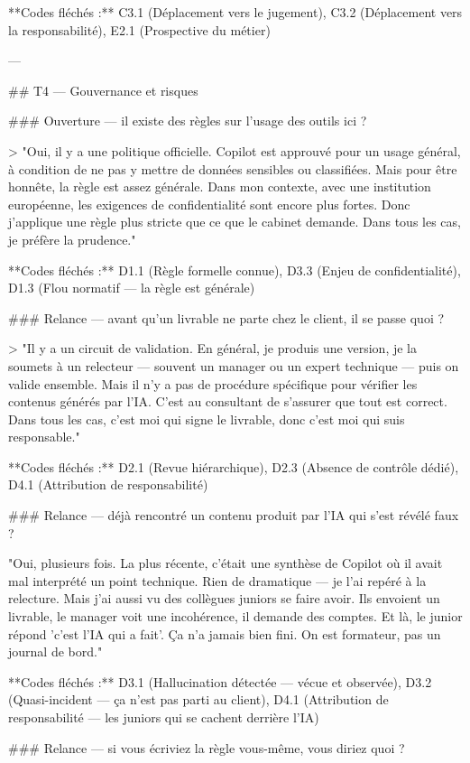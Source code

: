 **Codes fléchés :** C3.1 (Déplacement vers le jugement), C3.2 (Déplacement vers la responsabilité), E2.1 (Prospective du métier)

---

## T4 — Gouvernance et risques

### Ouverture — il existe des règles sur l'usage des outils ici ?

> "Oui, il y a une politique officielle. Copilot est approuvé pour un usage général, à condition de ne pas y mettre de données sensibles ou classifiées. Mais pour être honnête, la règle est assez générale. Dans mon contexte, avec une institution européenne, les exigences de confidentialité sont encore plus fortes. Donc j'applique une règle plus stricte que ce que le cabinet demande. Dans tous les cas, je préfère la prudence."

**Codes fléchés :** D1.1 (Règle formelle connue), D3.3 (Enjeu de confidentialité), D1.3 (Flou normatif — la règle est générale)

### Relance — avant qu'un livrable ne parte chez le client, il se passe quoi ?

> "Il y a un circuit de validation. En général, je produis une version, je la soumets à un relecteur — souvent un manager ou un expert technique — puis on valide ensemble. Mais il n'y a pas de procédure spécifique pour vérifier les contenus générés par l'IA. C'est au consultant de s'assurer que tout est correct. Dans tous les cas, c'est moi qui signe le livrable, donc c'est moi qui suis responsable."

**Codes fléchés :** D2.1 (Revue hiérarchique), D2.3 (Absence de contrôle dédié), D4.1 (Attribution de responsabilité)

### Relance — déjà rencontré un contenu produit par l'IA qui s'est révélé faux ?

"Oui, plusieurs fois. La plus récente, c'était une synthèse de Copilot où il avait mal interprété un point technique. Rien de dramatique — je l'ai repéré à la relecture. Mais j'ai aussi vu des collègues juniors se faire avoir. Ils envoient un livrable, le manager voit une incohérence, il demande des comptes. Et là, le junior répond 'c'est l'IA qui a fait'. Ça n'a jamais bien fini. On est formateur, pas un journal de bord."

**Codes fléchés :** D3.1 (Hallucination détectée — vécue et observée), D3.2 (Quasi-incident — ça n'est pas parti au client), D4.1 (Attribution de responsabilité — les juniors qui se cachent derrière l'IA)

### Relance — si vous écriviez la règle vous-même, vous diriez quoi ?

